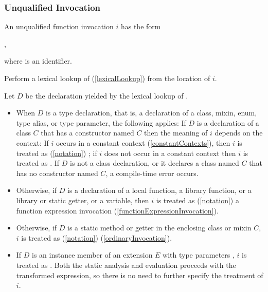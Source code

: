 \documentclass[makeidx]{article}
\begin{document}
{\subsubsection{Unqualified Invocation}

\LMHash{}%
An unqualified function invocation $i$ has the form

\noindent
{},

\noindent
where \id{} is an identifier.


\LMHash{}%
Perform a lexical lookup of \id{}
(\ref{lexicalLookup})
from the location of $i$.

\LMHash{}%
Let $D$ be the declaration yielded by the lexical lookup of \id.

\begin{itemize}
\item
  When $D$ is a type declaration, that is,
  a declaration of a class, mixin, enum, type alias, or type parameter,
  the following applies:
  If $D$ is a declaration of a class $C$
  that has a constructor named $C$
  then the meaning of $i$ depends on the context:
  If $i$ occurs in a constant context
  (\ref{constantContexts}),
  then $i$ is treated as
  (\ref{notation})
  ;
  if $i$ does not occur in a constant context
  then $i$ is treated as .
  If $D$ is not a class declaration,
  or it declares a class named $C$ that has no constructor named $C$,
  a compile-time error occurs.
\item
  Otherwise, if $D$ is a declaration of
  a local function,
  a library function, or
  a library or static getter, or a variable,
  then $i$ is treated as
  (\ref{notation})
  a function expression invocation
  (\ref{functionExpressionInvocation}).
\item
  Otherwise, if $D$ is
  a static method or getter
  in the enclosing class or mixin $C$,
  $i$ is treated as
  (\ref{notation})
  (\ref{ordinaryInvocation}).
\item
  If $D$ is an instance member of an extension $E$
  with type parameters ,
  $i$ is treated as .
  Both the static analysis and evaluation
  proceeds with the transformed expression,
  so there is no need to further specify the treatment of $i$.


\end{itemize}}
\end{document}
